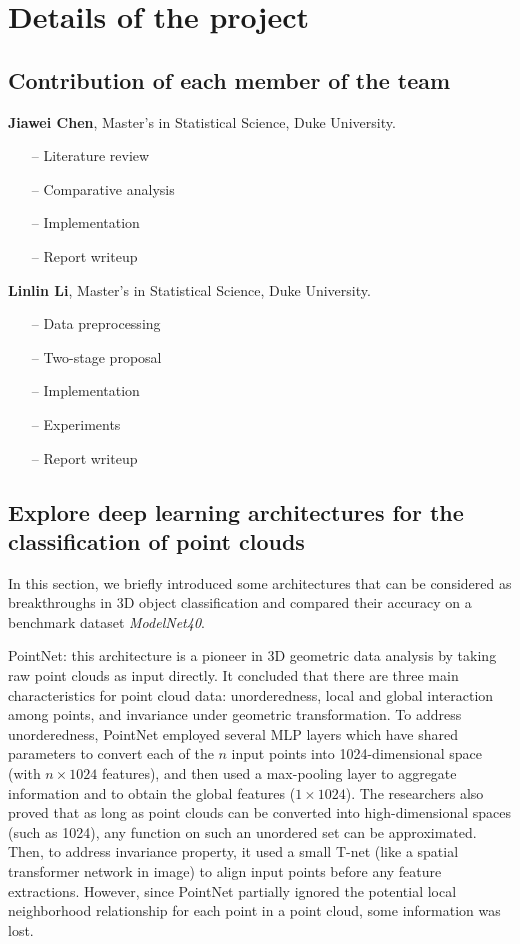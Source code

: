 \documentclass{article}
\begin{document}
\section{Details of the project}
\subsection{Contribution of each member of the team}
\textbf{Jiawei Chen}, Master's in Statistical Science, Duke University.
\begin{itemize}
  \item[--] Literature review
  \item[--] Comparative analysis 
  \item[--] Implementation
  \item[--] Report writeup 
\end{itemize}

\textbf{Linlin Li}, Master's in Statistical Science, Duke University.
\begin{itemize}
  \item[--] Data preprocessing
  \item[--] Two-stage proposal
  \item[--] Implementation
  \item[--] Experiments 
  \item[--] Report writeup 
\end{itemize}

\subsection{Explore deep learning architectures for the classification of point clouds}

In this section, we briefly introduced some architectures that can be considered as breakthroughs in 3D object classification and compared their accuracy on a benchmark dataset \textit{ModelNet40}.


PointNet\cite{pointnet}: this architecture is a pioneer in 3D geometric data analysis by taking raw point clouds as input directly. It concluded that there are three main characteristics for point cloud data: unorderedness, local and global interaction among points, and invariance under geometric transformation. To address unorderedness, PointNet employed several MLP layers which have shared parameters to convert each of the $n$ input points into 1024-dimensional space (with $n \times 1024$ features), and then used a max-pooling layer to aggregate information and to obtain the global features ($1 \times 1024$). The researchers also proved that as long as point clouds can be converted into high-dimensional spaces (such as 1024), any function on such an unordered set can be approximated. Then, to address invariance property, it used a small T-net (like a spatial transformer network in image) to align input points before any feature extractions. However, since PointNet partially ignored the potential local neighborhood relationship for each point in a point cloud, some information was lost.
\end{document}
